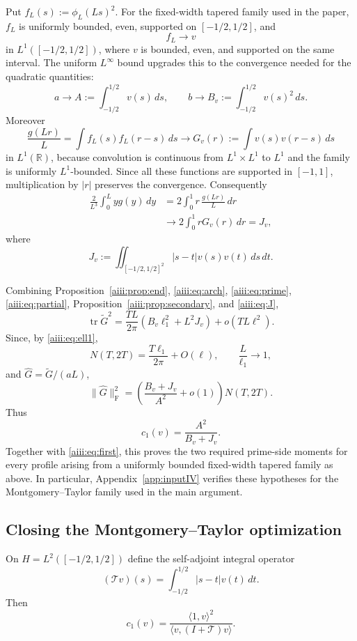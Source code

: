 \documentclass[11pt]{article}
\DeclareMathOperator{\tr}{tr}
\newcommand{\Frob}{\mathrm F}
\begin{document}
Put $f_L(s):=\phi_L(Ls)^2$.  For the fixed-width tapered family used in
the paper, $f_L$ is uniformly bounded, even, supported on
$[-1/2,1/2]$, and
\[
 f_L\to v
\]
in $L^1([-1/2,1/2])$, where $v$ is bounded, even, and supported on the same
interval.  The uniform $L^\infty$ bound upgrades this to the convergence
needed for the quadratic quantities:
\[
 a\to A:=\int_{-1/2}^{1/2}v(s)\,ds,
 \qquad
 b\to B_v:=\int_{-1/2}^{1/2}v(s)^2\,ds.
\]
Moreover
\[
 \frac{g(Lr)}{L}
 =\int f_L(s)f_L(r-s)\,ds
 \longrightarrow
 G_v(r):=\int v(s)v(r-s)\,ds
\]
in $L^1(\mathbb R)$, because convolution is continuous from
$L^1\times L^1$ to $L^1$ and the family is uniformly $L^1$-bounded.
Since all these functions are supported in $[-1,1]$, multiplication by
$|r|$ preserves the convergence.  Consequently
\begin{align}
 \frac{2}{L^3}\int_0^L yg(y)\,dy
 &=2\int_0^1 r\,\frac{g(Lr)}{L}\,dr \nonumber\\
 &\longrightarrow
 2\int_0^1 rG_v(r)\,dr
 =J_v,
 \label{aiii:eq:J}
\end{align}
where
\[
 J_v:=\iint_{[-1/2,1/2]^2}|s-t|v(s)v(t)\,ds\,dt.
\]

Combining Proposition~\ref{aiii:prop:end}, \eqref{aiii:eq:arch}, \eqref{aiii:eq:prime},
\eqref{aiii:eq:partial}, Proposition~\ref{aiii:prop:secondary}, and
\eqref{aiii:eq:J},
\[
 \tr\widetilde G^2
 =\frac{TL}{2\pi}\left(B_v\ell_1^2+L^2J_v\right)
 +o(TL\ell^2).
\]
Since, by \eqref{aiii:eq:ell1},
\[
 N(T,2T)=\frac{T\ell_1}{2\pi}+O(\ell),
 \qquad \frac{L}{\ell_1}\to1,
\]
and $\widehat G=\widetilde G/(aL)$,
\begin{equation}\label{aiii:eq:momentgeneral}
 \boxed{
 \|\widehat G\|_{\Frob}^2
 =\left(\frac{B_v+J_v}{A^2}+o(1)\right)N(T,2T).
 }
\end{equation}
Thus
\[
 c_1(v)=\frac{A^2}{B_v+J_v}.
\]
Together with \eqref{aiii:eq:first}, this proves the two required prime-side
moments for every profile arising from a uniformly bounded fixed-width tapered
family as above.  In particular, Appendix~\ref{app:inputIV} verifies these
hypotheses for the Montgomery--Taylor family used in the main argument.

\subsection{Closing the Montgomery--Taylor optimization}

On $H=L^2([-1/2,1/2])$ define the self-adjoint integral operator
\[
 (\mathcal Tv)(s)=\int_{-1/2}^{1/2}|s-t|v(t)\,dt.
\]
Then
\[
 c_1(v)=
 \frac{\langle1,v\rangle^2}
 {\langle v,(I+\mathcal T)v\rangle}.
\]
\end{document}
